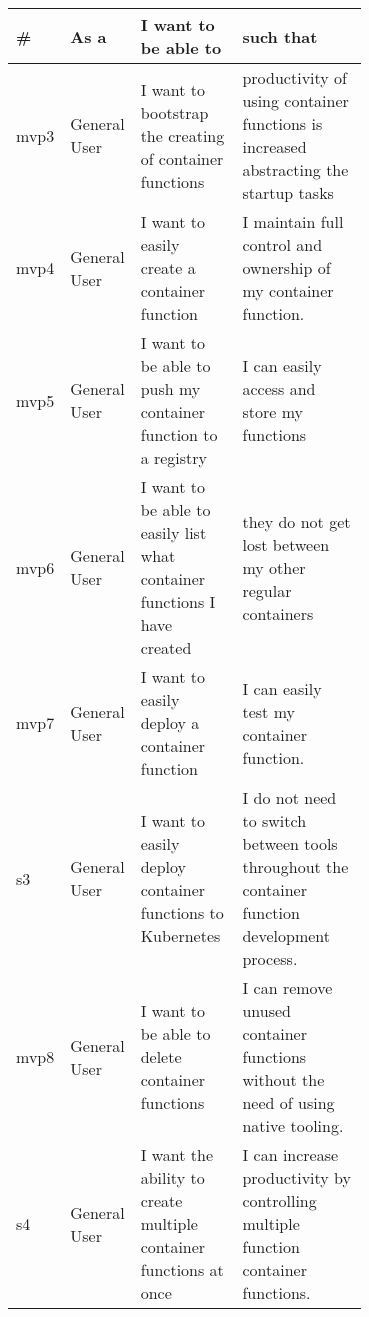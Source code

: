 \documentclass{article}
\begin{document}
\begin{table}[!ht]
\begin{tabular}{|l|l|p{0.3\linewidth}|p{0.4\linewidth}|}
\hline
\textbf{\#} & \textbf{As a} & \textbf{I want to be able to}                                             & \textbf{such that}                                                                                                                                       \\ \hline
mvp3        & General User  & I want to bootstrap the creating of container functions                   & productivity of using container functions is increased abstracting the startup tasks                               \\ \hline
mvp4        & General User  & I want to easily create a container function                              & I maintain full control and ownership of my container function.                                                                                          \\ \hline
mvp5        & General User  & I want to be able to push my container function to a registry             & I can easily access and store my functions                                                                                                               \\ \hline
mvp6        & General User  & I want to be able to easily list what container functions I have created  & they do not get lost between my other regular containers                                                                                                 \\ \hline
mvp7        & General User  & I want to easily deploy a container function                              & I can easily test my container function.                                                                                                                 \\ \hline
s3          & General User  & I want to easily deploy container functions to Kubernetes                 & I do not need to switch between tools throughout the container function development process. \\ \hline
mvp8        & General User  & I want to be able to delete container functions                           & I can remove unused container functions without the need of using native tooling.                                                                        \\ \hline
s4          & General User  & I want the ability to create multiple container functions at once         & I can increase productivity by controlling multiple function container functions.                                                                        \\ \hline

\end{tabular}
\end{table}
\end{document}
